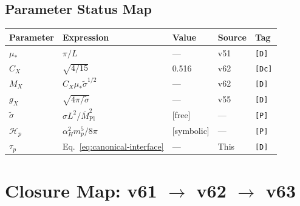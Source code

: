 \documentclass[11pt,a4paper]{article}
\newcommand{\tagD}{\textcolor{green!50!black}{\texttt{[D]}}}
\newcommand{\tagDc}{\textcolor{blue!70!black}{\texttt{[Dc]}}}
\newcommand{\tagP}{\textcolor{orange!80!black}{\texttt{[P]}}}
\theoremstyle{definition}
\begin{document}
\subsection{Parameter Status Map}
\label{subsec:status-map}

\begin{center}
\begin{tabular}{lllll}
\toprule
Parameter & Expression & Value & Source & Tag \\
\midrule
$\mu_*$ & $\pi/L$ & --- & v51 & \tagD{} \\
$C_X$ & $\sqrt{4/15}$ & 0.516 & v62 & \tagDc{} \\
$M_X$ & $C_X \mu_* \tilde{\sigma}^{1/2}$ & --- & v62 & \tagD{} \\
$g_X$ & $\sqrt{4\pi/\tilde{\sigma}}$ & --- & v55 & \tagD{} \\
$\tilde{\sigma}$ & $\sigma L^2/\bar{M}_{\text{Pl}}^2$ & [free] & --- & \tagP{} \\
$\mathcal{H}_p$ & $\alpha_H^2 m_p^5/8\pi$ & [symbolic] & --- & \tagP{} \\
$\tau_p$ & Eq.~\ref{eq:canonical-interface} & --- & This & \tagD{} \\
\bottomrule
\end{tabular}
\end{center}

\section{Closure Map: v61 $\to$ v62 $\to$ v63}
\label{sec:closure-map}
\end{document}
